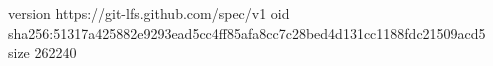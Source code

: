 version https://git-lfs.github.com/spec/v1
oid sha256:51317a425882e9293ead5cc4ff85afa8cc7c28bed4d131cc1188fdc21509acd5
size 262240

